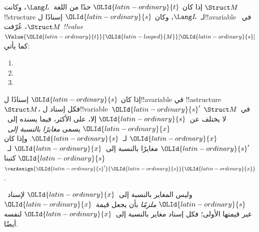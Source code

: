 \documentclass[../../../include/open-logic-section]{subfiles}
\begin{document}
\begin{defn}
إذا كان ${\OLId{latin-ordinary}{t}}$ حدًا من اللغة~$\Lang L$، وكانت $\Struct M$
!!{structure} لـ~$\Lang L$، وكان ${\OLId{latin-ordinary}{s}}$ إسنادًا ل!!a{variable}
في~$\Struct M$، عُرّفت \emph{!!{value}}~$\Value{{\OLId{latin-ordinary}{t}}}{{\OLId{latin-looped}{M}}}[{\OLId{latin-ordinary}{s}}]$ كما يأتي:
\begin{enumerate}
\item {}
\item {}
\item {}
\end{enumerate}
\end{defn}

\begin{defn}
إذا كان ${\OLId{latin-ordinary}{s}}$ إسنادًا ل!!a{variable} في !!a{structure}~$\Struct M$،
فكل إسناد ل!!{variable}~${\OLId{latin-ordinary}{s}}'$ في~$\Struct M$ لا يختلف عن~${\OLId{latin-ordinary}{s}}$ إلا،
على الأكثر، فيما يسنده إلى~${\OLId{latin-ordinary}{x}}$ يسمى \emph{مغايرًا بالنسبة إلى~${\OLId{latin-ordinary}{x}}$}
لـ~${\OLId{latin-ordinary}{s}}$. وإذا كان ${\OLId{latin-ordinary}{s}}'$ مغايرًا بالنسبة إلى~${\OLId{latin-ordinary}{x}}$ لـ~${\OLId{latin-ordinary}{s}}$ كتبنا
$\varAssign{{\OLId{latin-ordinary}{s}}'}{{\OLId{latin-ordinary}{s}}}{{\OLId{latin-ordinary}{x}}}$.
\end{defn}

\begin{explain}
وليس المغاير بالنسبة إلى~${\OLId{latin-ordinary}{x}}$ لإسناد~${\OLId{latin-ordinary}{s}}$ \emph{ملزمًا} بأن يجعل
قيمة~${\OLId{latin-ordinary}{x}}$ غير قيمتها الأولى؛ فكل إسناد مغاير بالنسبة
إلى~${\OLId{latin-ordinary}{x}}$ لنفسه أيضًا.
\end{explain}
\end{document}
